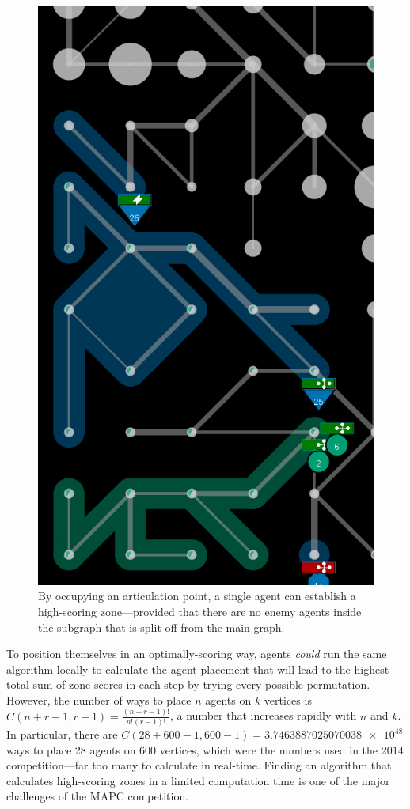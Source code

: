 \begin{figure}
  \centering
  \includegraphics[height=.5\textheight]{images/articulation_points}
  \caption{By occupying an articulation point, a single agent can establish a high-scoring zone---provided that there are no enemy agents inside the subgraph that is split off from the main graph.}
  \label{fig:articulation_points}
\end{figure}
To position themselves in an optimally-scoring way, agents \emph{could} run the same algorithm locally to calculate the agent placement that will lead to the highest total sum of zone scores in each step by trying every possible permutation.
However, the number of ways to place $n$ agents on $k$ vertices is $C \left (n+r-1,r-1\right )= \frac{\left(n+r-1 \right )!}{n!\left(r-1 \right )!}$, a number that increases rapidly with $n$ and $k$.
In particular, there are $C \left (28+600-1,600-1 \right ) =\num{3.7463887025070038e+48}$ ways to place 28 agents on 600 vertices, which were the numbers used in the 2014 competition---far too many to calculate in real-time.
Finding an algorithm that calculates high-scoring zones in a limited computation time is one of the major challenges of the MAPC competition.

